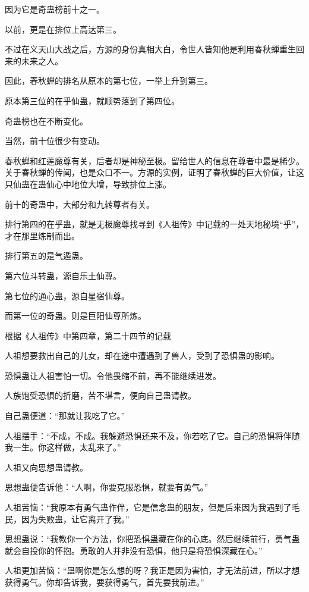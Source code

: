 \begin{this_body}
因为它是奇蛊榜前十之一。

以前，更是在排位上高达第三。

不过在义天山大战之后，方源的身份真相大白，令世人皆知他是利用春秋蝉重生回来的未来之人。

因此，春秋蝉的排名从原本的第七位，一举上升到第三。

原本第三位的在乎仙蛊，就顺势落到了第四位。

奇蛊榜也在不断变化。

当然，前十位很少有变动。

春秋蝉和红莲魔尊有关，后者却是神秘至极。留给世人的信息在尊者中最是稀少。关于春秋蝉的传闻，也是众口不一。方源的实例，证明了春秋蝉的巨大价值，让这只仙蛊在蛊仙心中地位大增，导致排位上涨。

前十的奇蛊中，大部分和九转尊者有关。

排行第四的在乎蛊，就是无极魔尊找寻到《人祖传》中记载的一处天地秘境“乎”，才在那里炼制而出。

排行第五的是气遁蛊。

第六位斗转蛊，源自乐土仙尊。

第七位的通心蛊，源自星宿仙尊。

而第一位的奇蛊。则是巨阳仙尊所炼。

根据《人祖传》中第四章，第二十四节的记载

人祖想要救出自己的儿女，却在途中遭遇到了兽人，受到了恐惧蛊的影响。

恐惧蛊让人祖害怕一切。令他畏缩不前，再不能继续进发。

人族饱受恐惧的折磨，苦不堪言，便向自己蛊请教。

自己蛊便道：“那就让我吃了它。”

人祖摆手：“不成，不成。我躲避恐惧还来不及，你若吃了它。自己的恐惧将伴随我一生。你这样做，太乱来了。”

人祖又向思想蛊请教。

思想蛊便告诉他：“人啊，你要克服恐惧，就要有勇气。”

人祖苦恼：“我原本有勇气蛊作伴，它是信念蛊的朋友，但是后来因为我遇到了毛民，因为失败蛊，让它离开了我。”

思想蛊说：“我教你一个方法，你把恐惧蛊藏在你的心底。然后继续前行，勇气蛊就会自投你的怀抱。勇敢的人并非没有恐惧，他只是将恐惧深藏在心。”

人祖更加苦恼：“蛊啊你是怎么想的呀？我正是因为害怕，才无法前进，所以才想获得勇气。你却告诉我，要获得勇气，首先要我前进。”


\end{this_body}
